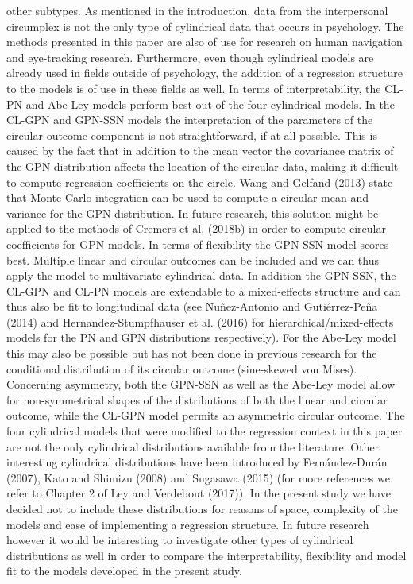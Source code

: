\documentclass[man,mask]{apa6}
\begin{document}
other subtypes.\newline
\indent As mentioned in the introduction, data from the interpersonal circumplex
is not the only type of cylindrical data that occurs in psychology. The methods
presented in this paper are also of use for research on human navigation and
eye-tracking research. Furthermore, even though cylindrical models are already
used in fields outside of psychology, the addition of a regression structure to
the models is of use in these fields as well. \newline
\indent In terms of interpretability, the CL-PN and Abe-Ley models perform
best out of the four cylindrical models. In the
CL-GPN and GPN-SSN models the interpretation of the parameters of the
circular outcome component is not straightforward, if at all possible.
This is caused by the fact that in addition to the mean vector the
covariance matrix of the GPN distribution affects the location of the
circular data, making it difficult to compute regression coefficients on
the circle. Wang and Gelfand (2013) state that Monte Carlo integration
can be used to compute a circular mean and variance for the GPN
distribution. In future research, this solution might be applied to the
methods of Cremers et al. (2018b) in order to compute circular
coefficients for GPN models.\newline
\indent In terms of flexibility the GPN-SSN model scores best. Multiple
linear and circular outcomes can be included and we can thus apply the
model to multivariate cylindrical data. In addition the GPN-SSN, the
CL-GPN and CL-PN models are extendable to a mixed-effects structure and
can thus also be fit to longitudinal data (see Nuñez-Antonio and Gutiérrez-Peña (2014) and Hernandez-Stumpfhauser et al. (2016) for
hierarchical/mixed-effects models for the PN and GPN distributions
respectively). For the Abe-Ley model this may also be possible but has
not been done in previous research for the conditional distribution of
its circular outcome (sine-skewed von
Mises). Concerning asymmetry, both the
GPN-SSN as well as the Abe-Ley model allow for non-symmetrical shapes of
the distributions of both the linear and circular outcome, while the CL-GPN
model permits an asymmetric circular outcome.\newline
\indent The four cylindrical models that were modified to the regression
context in this paper are not the only cylindrical distributions
available from the literature. Other interesting cylindrical distributions have been introduced by
Fernández-Durán (2007), Kato and Shimizu (2008) and Sugasawa (2015) (for more references we
refer to Chapter 2 of Ley and Verdebout (2017)). In the present study we
have decided not to include these distributions for reasons of space,
complexity of the models and ease of implementing a regression
structure. In future research however it would be interesting to
investigate other types of cylindrical distributions as well in order to
compare the interpretability, flexibility and model fit to the models
developed in the present study.
\end{document}
